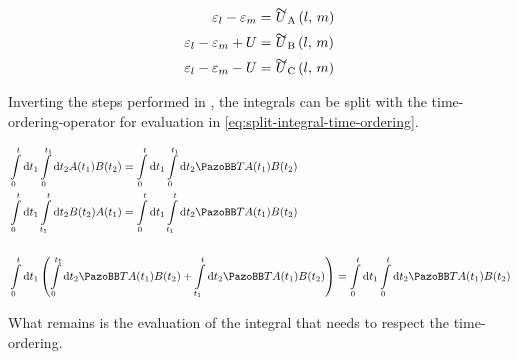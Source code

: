 \begin{equation}
    \label{eq:u-eps-substitution}
    \begin{split}
        \epsl-\epsl[m] &= \ueps{A}{l}{m}\\
        \epsl-\epsl[m]+U &= \ueps{B}{l}{m}\\
        \epsl-\epsl[m]-U &= \ueps{C}{l}{m}\\
    \end{split}
\end{equation}

Inverting the steps performed in \cite{dissectTimeOrderingIntegrals}, the integrals can be split with the time-ordering-operator for evaluation in \autoref{eq:split-integral-time-ordering}.

\begin{equation}
    \label{eq:split-integral-time-ordering}
    \begin{split}
        &\int\limits_0^t \mathrm{d}t_1 \int\limits_0^{t_1} \mathrm{d}t_2 A(t_1) B(t_2)  = \int\limits_0^t \mathrm{d}t_1 \int\limits_0^{t_1} \mathrm{d}t_2  \timeOrderingOperator A(t_1) B(t_2) \\
        &\int\limits_0^t \mathrm{d}t_1 \int\limits_{t_1}^t \mathrm{d}t_2  B(t_2) A(t_1)  = \int\limits_0^t \mathrm{d}t_1 \int\limits_{t_1}^t \mathrm{d}t_2  \timeOrderingOperator A(t_1) B(t_2) \\\\
        &\int\limits_0^t \mathrm{d}t_1 \left( \int\limits_0^{t_1} \mathrm{d}t_2 \timeOrderingOperator A(t_1) B(t_2) +  \int\limits_{t_1}^t \mathrm{d}t_2 \timeOrderingOperator A(t_1) B(t_2)\right) =
        \int\limits_0^t \mathrm{d}t_1\int\limits_0^t \mathrm{d}t_2 \timeOrderingOperator A(t_1) B(t_2)
    \end{split}
\end{equation}

What remains is the evaluation of the integral that needs to respect the time-ordering.


